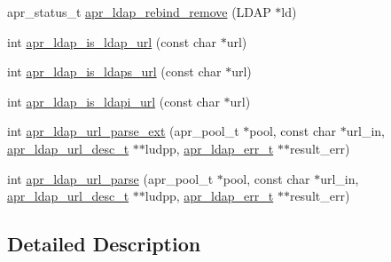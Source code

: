 \begin{DoxyCompactItemize}
\item 
apr\-\_\-status\-\_\-t \hyperlink{group___a_p_r___util___l_d_a_p_gaab75697e70fef5dbf5dfe272ea25630a}{apr\-\_\-ldap\-\_\-rebind\-\_\-remove} (L\-D\-A\-P $\ast$ld)
\item 
int \hyperlink{group___a_p_r___util___l_d_a_p_ga5b250f15fb43aca8af398895468acd8d}{apr\-\_\-ldap\-\_\-is\-\_\-ldap\-\_\-url} (const char $\ast$url)
\item 
int \hyperlink{group___a_p_r___util___l_d_a_p_ga89a664cdea8cdb01b8f1fb08fda8ad7b}{apr\-\_\-ldap\-\_\-is\-\_\-ldaps\-\_\-url} (const char $\ast$url)
\item 
int \hyperlink{group___a_p_r___util___l_d_a_p_ga5fa89f0ea59cdbe46396b1a7a16b8ffa}{apr\-\_\-ldap\-\_\-is\-\_\-ldapi\-\_\-url} (const char $\ast$url)
\item 
int \hyperlink{group___a_p_r___util___l_d_a_p_ga64e084c1ee8bc04a58f08a6aedd340fb}{apr\-\_\-ldap\-\_\-url\-\_\-parse\-\_\-ext} (apr\-\_\-pool\-\_\-t $\ast$pool, const char $\ast$url\-\_\-in, \hyperlink{structapr__ldap__url__desc__t}{apr\-\_\-ldap\-\_\-url\-\_\-desc\-\_\-t} $\ast$$\ast$ludpp, \hyperlink{structapr__ldap__err__t}{apr\-\_\-ldap\-\_\-err\-\_\-t} $\ast$$\ast$result\-\_\-err)
\item 
int \hyperlink{group___a_p_r___util___l_d_a_p_ga5cd5764d74a2b9f6fdbd3706ef467f04}{apr\-\_\-ldap\-\_\-url\-\_\-parse} (apr\-\_\-pool\-\_\-t $\ast$pool, const char $\ast$url\-\_\-in, \hyperlink{structapr__ldap__url__desc__t}{apr\-\_\-ldap\-\_\-url\-\_\-desc\-\_\-t} $\ast$$\ast$ludpp, \hyperlink{structapr__ldap__err__t}{apr\-\_\-ldap\-\_\-err\-\_\-t} $\ast$$\ast$result\-\_\-err)
\end{DoxyCompactItemize}


\subsection{Detailed Description}


